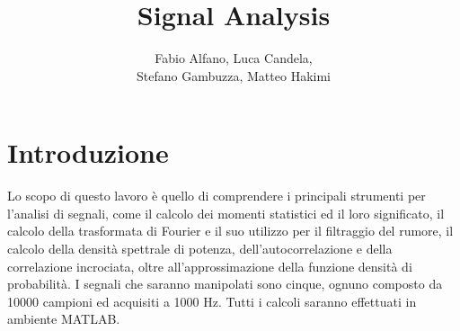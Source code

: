 \documentclass{article} %
\author{Fabio Alfano, Luca Candela,\\Stefano Gambuzza, Matteo Hakimi}
\title{Signal Analysis}
\date{}
\begin{document}
\maketitle

\clearpage
\tableofcontents
\clearpage

\section{Introduzione}
Lo scopo di questo lavoro è quello di comprendere i principali strumenti per l'analisi di segnali, come il calcolo dei momenti statistici ed il loro significato, il calcolo della trasformata di Fourier e il suo utilizzo per il filtraggio del rumore, il calcolo della densità spettrale di potenza, dell'autocorrelazione e della correlazione incrociata, oltre all'approssimazione della funzione densità di probabilità. I segnali che saranno manipolati sono cinque, ognuno composto da 10000 campioni ed acquisiti a 1000 Hz. Tutti i calcoli saranno effettuati in ambiente MATLAB.\par
\end{document}
